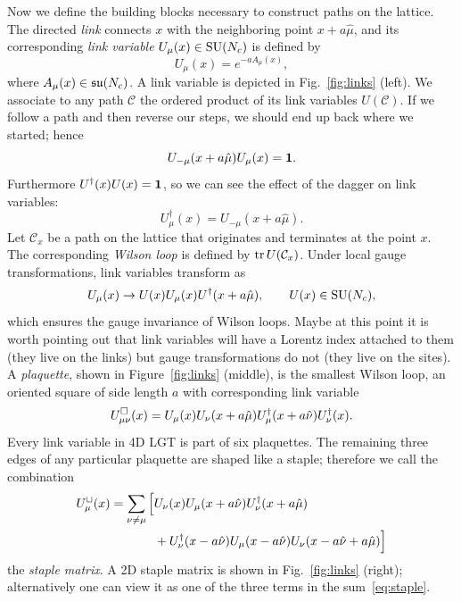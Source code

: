 Now we define the building blocks necessary to construct paths on the 
lattice. The directed {\it link} connects $x$ with the 
neighboring point $x+a\hat{\mu}$, and its corresponding {\it link variable} 
$U_\mu(x)\in \operatorname{SU}(N_c)$ is defined by
\begin{equation}
  U_\mu(x)=e^{-aA_{\mu}(x)},
\end{equation}
where $A_{\mu}(x)\in\operatorname{\mathfrak{su}}(N_c)$. A link variable is
depicted in Fig.~\ref{fig:links} (left).
We associate to any path $\mathcal{C}$ 
the ordered product of its link variables $U(\mathcal{C})$. 
If we follow a path and then reverse our steps, we should end
up back where we started; hence
\begin{equation}
  U_{-\mu}(x+a\hat{\mu})U_\mu(x)={\mathbf 1}.
\end{equation}
Furthermore $U^\dagger(x)U(x)={\mathbf 1}$, so we can see the effect
of the dagger on link variables:
\begin{equation}
  U_\mu^\dagger(x)=U_{-\mu}(x+a\hat{\mu}).
\end{equation}
Let $\mathcal{C}_{x}$ be a path on the lattice that originates and 
terminates at the point $x$. The corresponding {\it Wilson loop} is 
defined by $\tr U(\mathcal{C}_{x})$. 
Under local gauge transformations, link variables 
transform as
\begin{equation}
  U_\mu(x)\to U(x)U_\mu(x)U^{\dagger}(x+a\hat{\mu}),\qquad
  U(x)\in\operatorname{SU}(N_c),
\end{equation}
which ensures the gauge invariance of Wilson loops.
Maybe at this point it is worth pointing out that link variables will
have a Lorentz index attached to them (they live on the links) but
gauge transformations do not (they live on the sites). A 
{\it plaquette}, shown in Figure~\ref{fig:links} (middle), is the 
smallest Wilson loop, an oriented square of side length $a$ with 
corresponding link variable 
\begin{equation}
  U^\square_{\mu\nu}(x)=U_\mu(x)U_\nu(x+a\hat{\mu})
                        U^\dagger_\mu(x+a\hat{\nu})U^\dagger_\nu(x).
\end{equation}
Every link variable in 4D LGT is part of six plaquettes. The remaining
three edges of any particular plaquette are shaped like
a staple; therefore we call the combination
\begin{equation}\begin{aligned}\label{eq:staple}\index{staple}
  U^\sqcup_\mu(x)=
  \sum_{\nu\ne\mu}\Big[
   &U_\nu(x)U_\mu(x+a\hat{\nu})U^\dagger_\nu(x+a\hat{\mu})\\
   &+U^\dagger_\nu(x-a\hat{\nu})U_\mu(x-a\hat{\nu})
                   U_\nu(x-a\hat{\nu}+a\hat{\mu})\Big]
\end{aligned}\end{equation}
the {\it staple matrix}. A 2D staple matrix is shown in
Fig.~\ref{fig:links} (right); alternatively one can view it
as one of the three terms in the sum~\eqref{eq:staple}.

